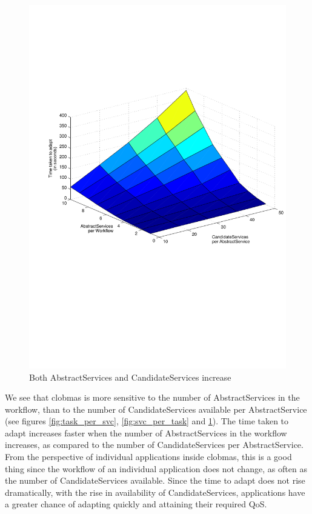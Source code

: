 \documentclass[10pt,journal,compsoc]{IEEEtran}
\begin{document}
\begin{figure}[htbp]
	\centering
	\includegraphics[clip, trim=3cm 11cm 2cm 7cm,scale=0.45]{graphs/scaling_time_task_candidates.pdf}
	\caption{Both AbstractServices and CandidateServices increase \label{fig:task_and_candidate_scaling}}
\end{figure}

We see that clobmas is more sensitive to the number of AbstractServices in the workflow, than to the number of CandidateServices available per AbstractService (see figures \ref{fig:task_per_svc}, \ref{fig:svc_per_task} and \ref{fig:task_and_candidate_scaling}). The time taken to adapt increases faster when the number of AbstractServices in the workflow increases, as compared to the number of CandidateServices per AbstractService. From the perspective of individual applications inside clobmas, this is a good thing since the workflow of an individual application does not change, as often as the number of CandidateServices available. Since the time to adapt does not rise dramatically, with the rise in availability of CandidateServices, applications have a greater chance of adapting quickly and attaining their required QoS.
\end{document}
